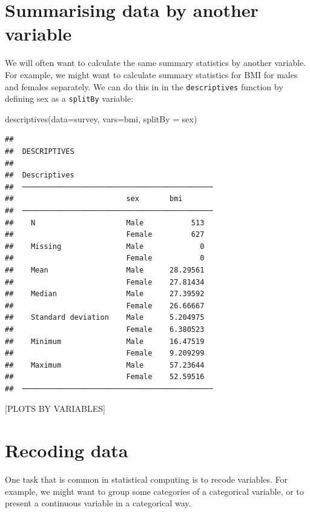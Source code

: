 \documentclass[
]{memoir}
\newenvironment{Shaded}{\begin{snugshade}}{\end{snugshade}}
\newcommand{\AttributeTok}[1]{\textcolor[rgb]{0.77,0.63,0.00}{#1}}
\newcommand{\FunctionTok}[1]{\textcolor[rgb]{0.00,0.00,0.00}{#1}}
\newcommand{\NormalTok}[1]{#1}
\begin{document}
\hypertarget{summarising-data-by-another-variable}{%
\section{Summarising data by another variable}\label{summarising-data-by-another-variable}}

We will often want to calculate the same summary statistics by another variable. For example, we might want to calculate summary statistics for BMI for males and females separately. We can do this in in the \texttt{descriptives} function by defining sex as a \texttt{splitBy} variable:

\begin{Shaded}
\begin{Highlighting}[]
\FunctionTok{descriptives}\NormalTok{(}\AttributeTok{data=}\NormalTok{survey, }\AttributeTok{vars=}\NormalTok{bmi, }\AttributeTok{splitBy =}\NormalTok{ sex)}
\end{Highlighting}
\end{Shaded}

\begin{verbatim}
## 
##  DESCRIPTIVES
## 
##  Descriptives                                 
##  ──────────────────────────────────────────── 
##                          sex       bmi        
##  ──────────────────────────────────────────── 
##    N                     Male           513   
##                          Female         627   
##    Missing               Male             0   
##                          Female           0   
##    Mean                  Male      28.29561   
##                          Female    27.81434   
##    Median                Male      27.39592   
##                          Female    26.66667   
##    Standard deviation    Male      5.204975   
##                          Female    6.380523   
##    Minimum               Male      16.47519   
##                          Female    9.209299   
##    Maximum               Male      57.23644   
##                          Female    52.59516   
##  ────────────────────────────────────────────
\end{verbatim}

{[}PLOTS BY VARIABLES{]}

\hypertarget{recoding-data}{%
\section{Recoding data}\label{recoding-data}}

One task that is common in statistical computing is to recode variables. For example, we might want to group some categories of a categorical variable, or to present a continuous variable in a categorical way.
\end{document}

